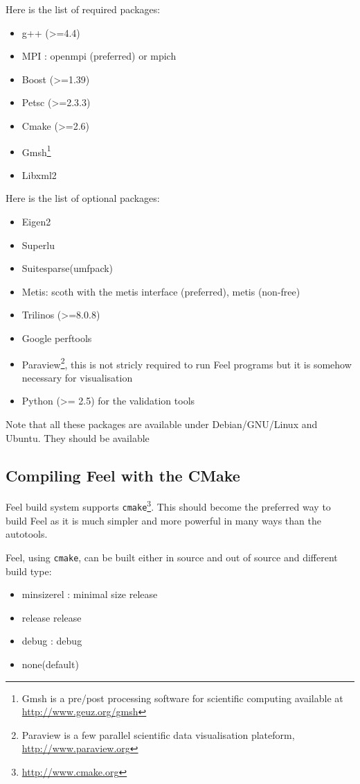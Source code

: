 \documentclass[a4paper]{book}
\newcommand{\feel}{Feel\xspace}
\newcommand{\cmake}{\texttt{cmake}\xspace}
\begin{document}
Here is the list of required packages:
\begin{itemize}
\item g++ (>=4.4)
\item MPI : openmpi (preferred) or mpich
\item Boost (>=1.39)
\item Petsc (>=2.3.3)
\item Cmake (>=2.6)
\item Gmsh\footnote{Gmsh is a pre/post processing software for scientific
computing available at \url{http://www.geuz.org/gmsh}}
\item Libxml2
\end{itemize}

Here is the list of optional packages:
\begin{itemize}
\item Eigen2
\item Superlu
\item Suitesparse(umfpack)
\item Metis: scoth with the metis interface (preferred), metis (non-free)
\item Trilinos (>=8.0.8)
\item Google perftools
\item Paraview\footnote{Paraview is a few parallel scientific data
    visualisation plateform, \url{http://www.paraview.org}}, this is
  not stricly required to run \feel programs but it is somehow
  necessary for visualisation
\item Python (>= 2.5) for the validation tools
\end{itemize}

Note that all these packages are available under Debian/GNU/Linux and
Ubuntu. They should be available

\subsection{Compiling Feel with the CMake}

Feel build system supports
\cmake{}\footnote{\url{http://www.cmake.org}}. This should become the
preferred way to build \feel as it is much simpler and more powerful in many
ways than the autotools.

\feel, using \cmake, can be built either in source and out of source and different
build type:
\begin{itemize}
\item minsizerel : minimal size release
\item release release
\item debug : debug
\item none(default)
\end{itemize}
\end{document}
